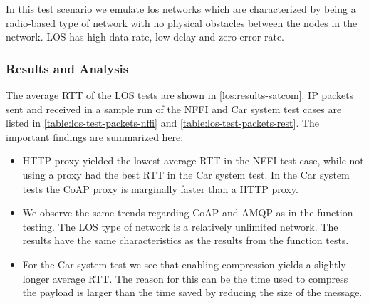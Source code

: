 In this test scenario we emulate \gls{los} networks which are characterized by
being a radio-based type of network with no physical obstacles between the nodes
in the network. LOS has high data rate, low delay and zero error rate.

\subsubsection{Results and Analysis}

The average RTT of the LOS tests are shown in \cref{los:results-satcom}. IP
packets sent and received in a sample run of the NFFI and Car system test cases
are listed in \cref{table:los-test-packets-nffi} and
\cref{table:los-test-packets-rest}. The important findings are summarized here:

\begin{itemize}

    \item HTTP proxy yielded the lowest average RTT in the NFFI test case, while not
    using a proxy had the best RTT in the Car system test. In the Car system tests the CoAP proxy is marginally faster than a
    HTTP proxy.

    \item We observe the same trends regarding CoAP and AMQP as in the function
    testing. The LOS type of network is a relatively unlimited network. The results
    have the same characteristics as the results from the function tests.

    \item For the Car system test we see that enabling compression yields a
    slightly longer average RTT. The reason for this can be the time used to
    compress the payload is larger than the time saved by reducing the size of
    the message.

\end{itemize}



